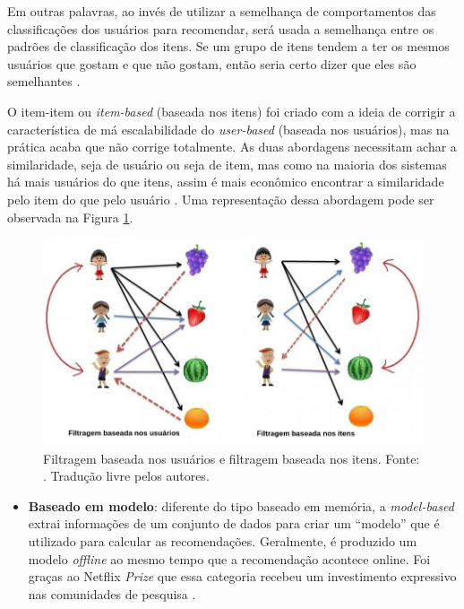 Em outras palavras, ao invés de utilizar a semelhança de comportamentos das classificações dos usuários para recomendar, será usada a semelhança entre os padrões de classificação dos itens. Se um grupo de itens tendem a ter os mesmos usuários que gostam e que não gostam, então seria certo dizer que eles são semelhantes \cite{Ekstrand:2011:CFR:2185827.2185828}.

O item-item ou \textit{item-based} (baseada nos itens) foi criado com a ideia de corrigir a característica de má escalabilidade do \textit{user-based} (baseada nos usuários), mas na prática acaba que não corrige totalmente. As duas abordagens necessitam achar a similaridade, seja de usuário ou seja de item, mas como na maioria dos sistemas há mais usuários do que itens, assim é mais econômico encontrar a similaridade pelo item do que pelo usuário \cite{Ekstrand:2011:CFR:2185827.2185828}. Uma representação dessa abordagem pode ser observada na Figura \ref{fig:user_based_item_based}.

\begin{figure}[H]
    \centering
    \includegraphics[scale=0.4]{figuras/referencial_teorico/user_based_item_based.png}
    \caption[Filtragem baseada nos usuários e filtragem baseada nos itens]{Filtragem baseada nos usuários e filtragem baseada nos itens. Fonte: \cite{Pinela:2017}. Tradução livre pelos autores.}
    \label{fig:user_based_item_based}
\end{figure}

\begin{itemize}
    \item \textbf{Baseado em modelo}: diferente do tipo baseado em memória, a \textit{model-based} extrai informações de um conjunto de dados para criar um “modelo” que é utilizado para calcular as recomendações. Geralmente, é produzido um modelo \textit{offline} ao mesmo tempo que a recomendação acontece online. Foi graças ao Netflix \textit{Prize} que essa categoria recebeu um investimento expressivo nas comunidades de pesquisa \cite{Levinas2014AnAO}.
\end{itemize}

